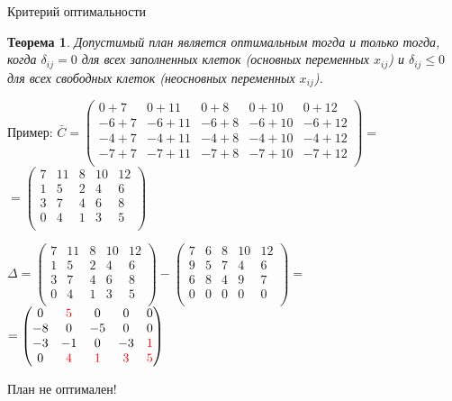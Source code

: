 \documentclass[unicode,11pt,notheorems,xcolor=table]{beamer}
\newtheorem{theorem}{Теорема}
\begin{document}
\begin{frame}{Критерий оптимальности}{}
	\begin{theorem}
		Допустимый план является оптимальным тогда и только тогда, когда 
		$\delta_{ij} = 0$ для всех заполненных клеток (основных переменных $x_{ij}$) и
		$\delta_{ij} \leqslant 0$ для всех свободных клеток (неосновных переменных $x_{ij}$).         
	\end{theorem}
\end{frame}


\begin{frame}{Пример:}
	\small
	$
	\bar{C}=
	\begin{pmatrix}
	0+7 & 0+11 & 0+8 & 0+10 & 0+12\\
	-6+7 & -6+11 & -6+8 & -6+10 & -6+12\\
	-4+7 & -4+11 & -4+8 & -4+10 & -4+12\\
	-7+7 & -7+11 & -7+8 & -7+10 & -7+12\\
	\end{pmatrix}
	=$\\
	\hfill$=
	\begin{pmatrix}
	7 & 11 & 8 & 10 & 12\\
	1 & 5 & 2 & 4 & 6\\
	3 & 7 & 4 & 6 & 8\\
	0 & 4 & 1 & 3 & 5\\
	\end{pmatrix}
	$
	
	\bigskip
	$
	\Delta=
	\begin{pmatrix}
	7 & 11 & 8 & 10 & 12\\
	1 & 5 & 2 & 4 & 6\\
	3 & 7 & 4 & 6 & 8\\
	0 & 4 & 1 & 3 & 5\\
	\end{pmatrix}
	-
	\begin{pmatrix}
	7 & 6 & 8 & 10 & 12\\
	9 & 5 & 7 & 4 & 6\\
	6 & 8 & 4 & 9 & 7\\
	0 & 0 & 0 & 0 & 0\\
	\end{pmatrix}
	=$\\
	\hfill$=
	\begin{pmatrix}
	0 & \color{red}5 & 0 & 0 & 0\\
	-8 & 0 & -5 & 0 & 0\\
	-3 & -1 & 0 & -3 & \color{red}1\\
	0 & \color{red}4 & \color{red}1 & \color{red}3 &\color{red} 5\\
	\end{pmatrix}
	$
	
	{\centering \color{red} План не оптимален!\par}
\end{frame}    
\end{document}
